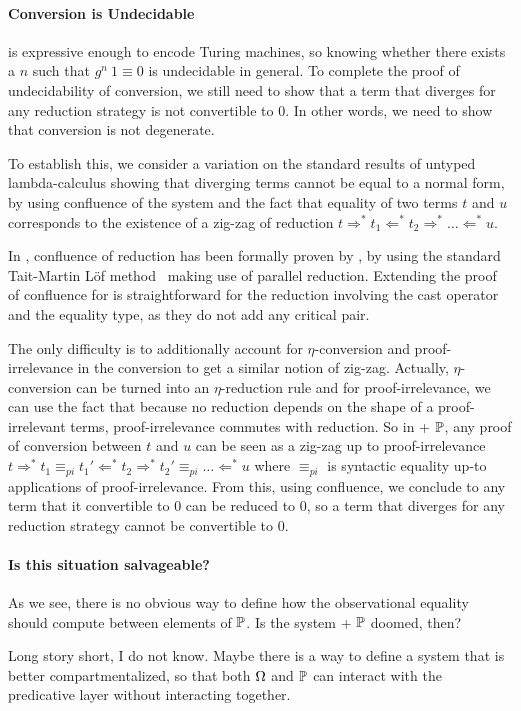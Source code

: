 
\paragraph{Conversion is Undecidable}

\SetoidCC is expressive enough to encode Turing machines, so
knowing whether there exists a \( n \) such that \( g^n\ 1 \equiv 0 \) is
undecidable in general.
%
To complete the proof of undecidability of conversion, we still need
to show that a term that diverges for any reduction strategy is not
convertible to $0$. In other words, we need to show that conversion is
not degenerate.

To establish this, we consider a variation on the standard results of untyped
lambda-calculus  showing that diverging terms
cannot be equal to a normal form, by using confluence of the system
and the fact that equality of two terms $t$ and $u$ corresponds to the
existence of a zig-zag of reduction $t \Rightarrow^* t_1 \Leftarrow^*
t_2\Rightarrow^*\dots \Leftarrow^* u$.

In \CIC, confluence of reduction has been formally proven by
, by using the standard Tait-Martin Löf
method~ making use of parallel
reduction.
%
Extending the proof of confluence for \SetoidCC is straightforward for
the reduction involving the cast operator and the equality type, as
they do not add any critical pair.

The only difficulty is to additionally account for $\eta$-conversion
and proof-irrelevance in the conversion to get a similar notion of
zig-zag.
%
Actually, $\eta$-conversion can be turned into an
$\eta$-reduction rule and for proof-irrelevance, we can use the fact
that because no reduction depends on the shape of a proof-irrelevant
terms, proof-irrelevance commutes with reduction.
So in \SetoidCC + $\mathbb{P}$, any proof of conversion between $t$ and $u$
can be seen as a zig-zag up to proof-irrelevance
%
$t \Rightarrow^* t_1 \equiv_{pi} t_1' \Leftarrow^*
t_2\Rightarrow ^* t_2' \equiv_{pi} \dots \Leftarrow^* u$ where $\equiv_{pi}$ is syntactic
equality up-to applications of proof-irrelevance.
%
From this, using confluence, we conclude to any term that it convertible to $0$ can be
reduced to $0$, so a term that diverges for any reduction strategy
cannot be convertible to $0$.

\paragraph{Is this situation salvageable?}
% 
As we see, there is no obvious way to define how the observational equality 
should compute between elements of \( \mathbb{P} \). 
% 
Is the system \SetoidCC + \( \mathbb{P} \) doomed, then?

Long story short, I do not know. Maybe there is a way to define a system that
is better compartmentalized, so that both \( \Omega \) and \( \mathbb{P} \) can 
interact with the predicative layer without interacting together. 